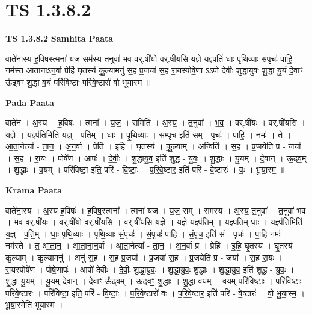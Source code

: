 \documentclass[17pt]{extarticle}
\begin{document}
\section{ TS 1.3.8.2 }

\textbf{TS 1.3.8.2 } \newline
\textbf{Samhita Paata} \newline

वाते॑ना॒स्य ह॒विष॒स्त्मना॑ यज॒ सम॑स्य त॒नुवा॑ भव॒ वर्.षी॑यो॒ वर्.षी॑यसि य॒ज्ञे य॒ज्ञ्पतिं॑ धाः पृ॑थि॒व्याः सं॒पृचः॑ पाहि॒ नम॑स्त आतानाऽन॒र्वा प्रेहि॑ घृ॒तस्य॑ कु॒॒ल्यामनु॑ स॒ह प्र॒जया॑ स॒ह रा॒यस्पोषे॒णा ऽऽपो॑ देवीः शुद्धायुवः शु॒द्धा यू॒यं दे॒वाꣳ ऊ᳚ढ्वꣳ शु॒द्धा व॒यं परि॑विष्टाः परिवे॒ष्टारो॑ वो भूयास्म ॥ \newline

\textbf{Pada Paata} \newline

वाते॑न । अ॒स्य । ह॒विषः॑ । त्मना᳚ । य॒ज॒ । समिति॑ । अ॒स्य॒ । त॒नुवा᳚ । भ॒व॒ । वर्.षी॑यः । वर्.षी॑यसि । य॒ज्ञे । य॒ज्ञ्प॑ति॒मिति॑ य॒ज्ञ् - प॒ति॒म् । धाः॒ । पृ॒थि॒व्याः । स॒म्पृच॒ इति॑ सम् - पृचः॑ । पा॒हि॒ । नमः॑ । ते॒ । आ॒ता॒नेत्या᳚ - ता॒न॒ । अ॒न॒र्वा । प्रेति॑ । इ॒हि॒ । घृ॒तस्य॑ । कु॒॒ल्याम् । अन्विति॑ । स॒ह । प्र॒जयेति॑ प्र - जया᳚ । स॒ह । रा॒यः । पोषे॑ण । आपः॑ । दे॒वीः॒ । शु॒द्धा॒यु॒व॒ इति॑ शुद्ध - यु॒वः॒ । शु॒द्धाः । यू॒यम् । दे॒वान् । ऊ॒ढ्व॒म् । शु॒द्धाः । व॒यम् । परि॑विष्टा॒ इति॒ परि॑ - वि॒ष्टाः॒ । प॒रि॒वे॒ष्टार॒ इति॑ परि - वे॒ष्टारः॑ । वः॒ । भू॒या॒स्म॒ ॥  \newline


\textbf{Krama Paata} \newline

वाते॑ना॒स्य । अ॒स्य ह॒विषः॑ । ह॒विष॒स्त्मना᳚ । त्मना॑ यज । य॒ज॒ सम् । सम॑स्य । अ॒स्य॒ त॒नुवा᳚ । त॒नुवा॑ भव । भ॒व॒ वर्.षी॑यः । वर्.षी॑यो॒ वर्.षी॑यसि । वर्.षी॑यसि य॒ज्ञे । य॒ज्ञे य॒ज्ञ्प॑तिम् । य॒ज्ञ्प॑तिम् धाः । य॒ज्ञ्प॑ति॒मिति॑ य॒ज्ञ् - प॒ति॒म् । धाः॒ पृ॒थि॒व्याः । पृ॒थि॒व्याः सं॒पृचः॑ । सं॒पृचः॑ पाहि । सं॒पृच॒ इति॑ सं - पृचः॑ । पा॒हि॒ नमः॑ । नम॑स्ते । त॒ आ॒ता॒न॒ । आ॒ता॒ना॒न॒र्वा । आ॒ता॒नेत्या᳚ - ता॒न॒ । अ॒न॒र्वा प्र । प्रेहि॑ । इ॒हि॒ घृ॒तस्य॑ । घृ॒तस्य॑ कु॒ल्याम् । कु॒ल्यामनु॑ । अनु॑ स॒ह । स॒ह प्र॒जया᳚ । प्र॒जया॑ स॒ह । प्र॒जयेति॑ प्र - जया᳚ । स॒ह रा॒यः । रा॒यस्पोषे॑ण । पोषे॒णापः॑ । आपो॑ देवीः । दे॒वीः॒ शु॒द्धा॒यु॒वः॒ । शु॒द्धा॒यु॒वः॒ शु॒द्धाः । शु॒द्धा॒यु॒व॒ इति॑ शुद्ध - यु॒वः॒ । शु॒द्धा यू॒यम् । यू॒यम् दे॒वान् । दे॒वाꣳ ऊ᳚ढ्वम् । ऊ॒ढ्वꣳ॒॒ शु॒द्धाः । शु॒द्धा व॒यम् । व॒यम् परि॑विष्टाः । परि॑विष्टाः परिवे॒ष्टारः॑ । परि॑विष्टा॒ इति॒ परि॑ - वि॒ष्टाः॒ । प॒रि॒वे॒ष्टारो॑ वः । प॒रि॒वे॒ष्टार॒ इति॑ परि - वे॒ष्टारः॑ । वो॒ भू॒या॒स्म॒ । भू॒या॒स्मेति॑ भूयास्म । \newline
\end{document}

